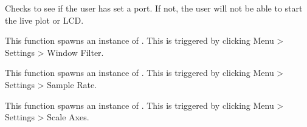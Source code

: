 \documentclass[letterpaper,10pt,english]{sphinxmanual}
\begin{document}
\begin{fulllineitems}
\begin{fulllineitems}
\end{fulllineitems}


\begin{fulllineitems}
\label{\detokenize{mainWindow:mainWindow.Ui_MainWindow.check_port}}
Checks to see if the user has set a port. If not, the user will not be able to start the live plot or LCD.

\end{fulllineitems}


\begin{fulllineitems}
\label{\detokenize{mainWindow:mainWindow.Ui_MainWindow.open_settings_filter}}
This function spawns an instance of . This is triggered by
clicking Menu \textgreater{} Settings \textgreater{} Window Filter.

\end{fulllineitems}


\begin{fulllineitems}
\label{\detokenize{mainWindow:mainWindow.Ui_MainWindow.open_settings_sample_rate}}
This function spawns an instance of . This is triggered by
clicking Menu \textgreater{} Settings \textgreater{} Sample Rate.

\end{fulllineitems}


\begin{fulllineitems}
\label{\detokenize{mainWindow:mainWindow.Ui_MainWindow.open_settings_scale_axes}}
This function spawns an instance of . This is triggered by
clicking Menu \textgreater{} Settings \textgreater{} Scale Axes.


\end{fulllineitems}
\end{fulllineitems}
\end{document}
